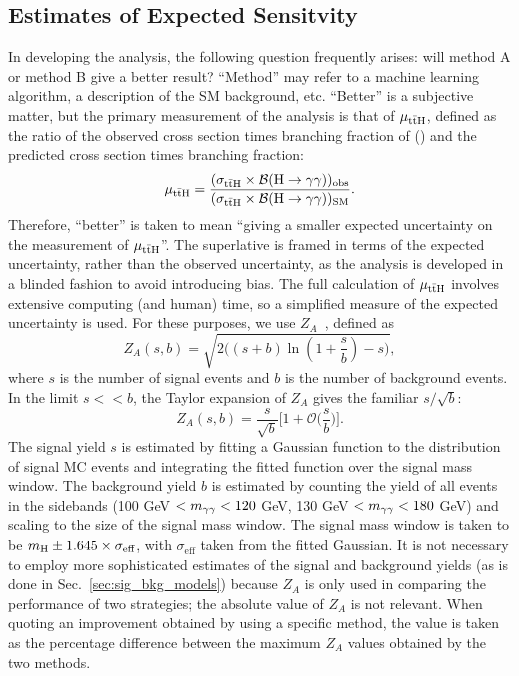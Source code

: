 \subsection{Estimates of Expected Sensitvity} \label{sec:tth_za}
In developing the \ttH analysis, the following question frequently arises: will method A or method B give a better result?
``Method'' may refer to a machine learning algorithm, a description of the SM background, etc.
``Better'' is a subjective matter, but the primary measurement of the \ttH analysis is that of $\mu_{\mathrm{t\bar{t}H}}$, defined as the ratio of the observed cross section times branching fraction of \ttH (\Hgg) and the predicted cross section times branching fraction:
\begin{equation}
    \mu_{\mathrm{t\bar{t}H}} = \frac{(\sigma_{\mathrm{t\bar{t}H}} \times \mathcal B (\mathrm{H\to\gamma\gamma}))_{\text{obs}}}{(\sigma_{\mathrm{t\bar{t}H}} \times \mathcal B (\mathrm{H\to\gamma\gamma}))_{\text{SM}}}.
\end{equation}
Therefore, ``better'' is taken to mean ``giving a smaller expected uncertainty on the measurement of $\mu_{\mathrm{t\bar{t}H}}$''.
The superlative is framed in terms of the expected uncertainty, rather than the observed uncertainty, as the analysis is developed in a blinded fashion to avoid introducing bias.
The full calculation of $\mu_{\mathrm{t\bar{t}H}}$ involves extensive computing (and human) time, so a simplified measure of the expected uncertainty is used.
For these purposes, we use $Z_A$~\cite{cowan_za}, defined as
\begin{equation}
    Z_A(s,b) = \sqrt{2 \bigg((s+b)\ln(1 + \frac{s}{b})-s\bigg)},
\end{equation}
where $s$ is the number of signal events and $b$ is the number of background events.
In the limit $s<<b$, the Taylor expansion of $Z_A$ gives the familiar $s/\sqrt{b}$:
\begin{equation}
    Z_A(s,b) = \frac{s}{\sqrt{b}}\bigg[1 + \mathcal O \bigg(\frac{s}{b}\bigg) \Bigg].
\end{equation}
The signal yield $s$ is estimated by fitting a Gaussian function to the \mgg distribution of signal MC events and integrating the fitted function over the signal mass window.
The background yield $b$ is estimated by counting the yield of all events in the \mgg sidebands (100 GeV $< m_{\gamma\gamma} < 120$ GeV, 130 GeV $< m_{\gamma\gamma} < 180$ GeV) and scaling to the size of the signal mass window.
The signal mass window is taken to be $m_{\mathrm{H}} \pm 1.645 \times \sigma_{\text{eff}}$, with $\sigma_{\text{eff}}$ taken from the fitted Gaussian.
It is not necessary to employ more sophisticated estimates of the signal and background yields (as is done in Sec.~\ref{sec:sig_bkg_models}) because $Z_A$ is only used in comparing the performance of two strategies; the absolute value of $Z_A$ is not relevant.
When quoting an improvement obtained by using a specific method, the value is taken as the percentage difference between the maximum $Z_A$ values obtained by the two methods.
